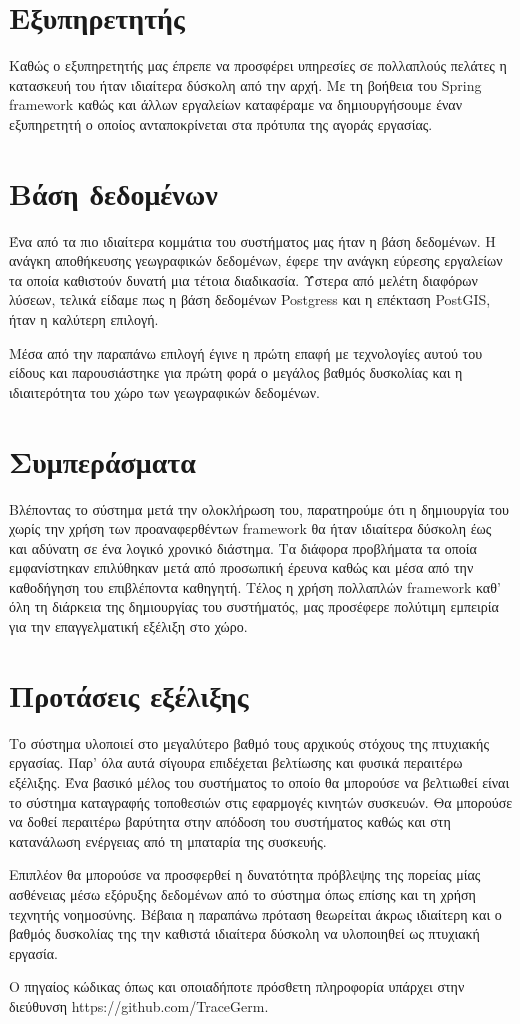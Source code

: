 \section{Εξυπηρετητής}
Καθώς ο εξυπηρετητής μας έπρεπε να προσφέρει υπηρεσίες σε πολλαπλούς πελάτες η κατασκευή του ήταν ιδιαίτερα δύσκολη από την αρχή. Με τη βοήθεια του Spring framework καθώς και άλλων εργαλείων καταφέραμε να δημιουργήσουμε έναν εξυπηρετητή ο οποίος ανταποκρίνεται στα πρότυπα της αγοράς εργασίας. 

\section{Βάση δεδομένων}
Ένα από τα πιο ιδιαίτερα κομμάτια του συστήματος μας ήταν η βάση δεδομένων. Η ανάγκη αποθήκευσης γεωγραφικών δεδομένων, έφερε την ανάγκη εύρεσης εργαλείων τα οποία καθιστούν δυνατή μια τέτοια διαδικασία. Ύστερα από μελέτη διαφόρων λύσεων, τελικά είδαμε πως η βάση δεδομένων Postgress και η επέκταση PostGIS, ήταν η καλύτερη επιλογή. 

\par
Μέσα από την παραπάνω επιλογή έγινε η πρώτη επαφή με τεχνολογίες αυτού του είδους και παρουσιάστηκε για πρώτη φορά ο μεγάλος βαθμός δυσκολίας και η ιδιαιτερότητα του χώρο των γεωγραφικών δεδομένων. 

\section{Συμπεράσματα}
Βλέποντας το σύστημα μετά την ολοκλήρωση του, παρατηρούμε ότι η δημιουργία του χωρίς την χρήση των προαναφερθέντων framework θα ήταν ιδιαίτερα δύσκολη έως και αδύνατη σε ένα λογικό χρονικό διάστημα. Τα διάφορα προβλήματα τα οποία εμφανίστηκαν επιλύθηκαν μετά από προσωπική έρευνα καθώς και μέσα από την καθοδήγηση του επιβλέποντα καθηγητή. Τέλος η χρήση πολλαπλών framework καθ’ όλη τη διάρκεια της δημιουργίας του συστήματός, μας προσέφερε πολύτιμη εμπειρία για την επαγγελματική εξέλιξη στο χώρο.

\section{Προτάσεις εξέλιξης}
Το σύστημα υλοποιεί στο μεγαλύτερο βαθμό τους αρχικούς στόχους της πτυχιακής εργασίας. Παρ’ όλα αυτά σίγουρα επιδέχεται βελτίωσης και φυσικά περαιτέρω εξέλιξης. Ένα βασικό μέλος του συστήματος το οποίο θα μπορούσε να βελτιωθεί είναι το σύστημα καταγραφής τοποθεσιών στις εφαρμογές κινητών συσκευών. Θα μπορούσε να δοθεί περαιτέρω βαρύτητα στην απόδοση του συστήματος καθώς και στη κατανάλωση ενέργειας από τη μπαταρία της συσκευής. 

\par
Επιπλέον θα μπορούσε να προσφερθεί η δυνατότητα πρόβλεψης της πορείας μίας ασθένειας μέσω εξόρυξης δεδομένων από το σύστημα όπως επίσης και τη χρήση τεχνητής νοημοσύνης. Βέβαια η παραπάνω πρόταση θεωρείται άκρως ιδιαίτερη και ο βαθμός δυσκολίας της την καθιστά ιδιαίτερα δύσκολη να υλοποιηθεί ως πτυχιακή εργασία.

Ο πηγαίος κώδικας όπως και οποιαδήποτε πρόσθετη πληροφορία υπάρχει στην διεύθυνση
https://github.com/TraceGerm.
